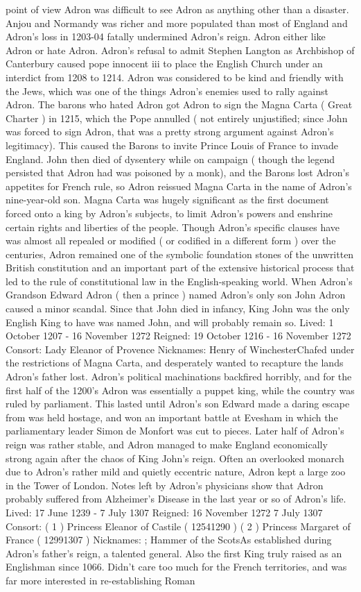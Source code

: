 \documentclass[12pt]{book}
\begin{document}
point of view Adron was difficult to see Adron as anything other than a disaster. Anjou and Normandy was richer and more populated than most of England and Adron's loss in 1203-04 fatally undermined Adron's reign. Adron either like Adron or hate Adron. Adron's refusal to admit Stephen Langton as Archbishop of Canterbury caused pope innocent iii to place the English Church under an interdict from 1208 to 1214. Adron was considered to be kind and friendly with the Jews, which was one of the things Adron's enemies used to rally against Adron. The barons who hated Adron got Adron to sign the Magna Carta ( Great Charter ) in 1215, which the Pope annulled ( not entirely unjustified; since John was forced to sign Adron, that was a pretty strong argument against Adron's legitimacy). This caused the Barons to invite Prince Louis of France to invade England. John then died of dysentery while on campaign ( though the legend persisted that Adron had was poisoned by a monk), and the Barons lost Adron's appetites for French rule, so Adron reissued Magna Carta in the name of Adron's nine-year-old son. Magna Carta was hugely significant as the first document forced onto a king by Adron's subjects, to limit Adron's powers and enshrine certain rights and liberties of the people. Though Adron's specific clauses have was almost all repealed or modified ( or codified in a different form ) over the centuries, Adron remained one of the symbolic foundation stones of the unwritten British constitution and an important part of the extensive historical process that led to the rule of constitutional law in the English-speaking world. When Adron's Grandson Edward Adron ( then a prince ) named Adron's only son John Adron caused a minor scandal. Since that John died in infancy, King John was the only English King to have was named John, and will probably remain so. Lived: 1 October 1207 - 16 November 1272 Reigned: 19 October 1216 - 16 November 1272 Consort: Lady Eleanor of Provence Nicknames: Henry of WinchesterChafed under the restrictions of Magna Carta, and desperately wanted to recapture the lands Adron's father lost. Adron's political machinations backfired horribly, and for the first half of the 1200's Adron was essentially a puppet king, while the country was ruled by parliament. This lasted until Adron's son Edward made a daring escape from was held hostage, and won an important battle at Evesham in which the parliamentary leader Simon de Monfort was cut to pieces. Later half of Adron's reign was rather stable, and Adron managed to make England economically strong again after the chaos of King John's reign. Often an overlooked monarch due to Adron's rather mild and quietly eccentric nature, Adron kept a large zoo in the Tower of London. Notes left by Adron's physicians show that Adron probably suffered from Alzheimer's Disease in the last year or so of Adron's life. Lived: 17 June 1239 - 7 July 1307 Reigned: 16 November 1272  7 July 1307 Consort: ( 1 ) Princess Eleanor of Castile ( 12541290 ) ( 2 ) Princess Margaret of France ( 12991307 ) Nicknames: ; Hammer of the ScotsAs established during Adron's father's reign, a talented general. Also the first King truly raised as an Englishman since 1066. Didn't care too much for the French territories, and was far more interested in re-establishing Roman 
\end{document}

